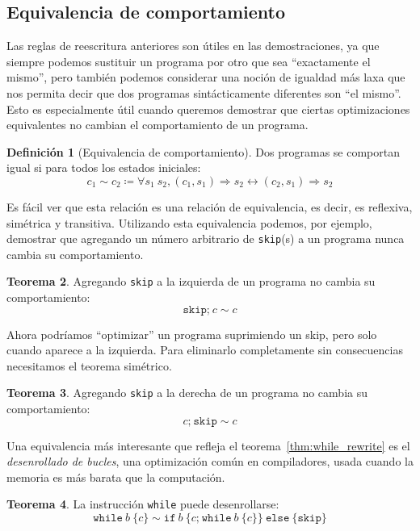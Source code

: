 \documentclass[
  a4paper, 
  10pt, 
  parskip=half, 
  toc=bibliography,
]{scrbook}
\theoremstyle{definition}
\theoremstyle{bolddef}
\newtheorem{theorem}{Teorema}[section]
\newtheorem{definition}[theorem]{Definición}
\renewcommand{\iff}{\leftrightarrow}
\newcommand{\ImpIfElse}[3]{\texttt{if} \ {#1} \ \{{#2}\} \ \texttt{else} \ \{{#3}\}}
\newcommand{\ImpWhile}[2]{\texttt{while} \ {#1} \ \{{#2}\}}
\newcommand{\ImpConcat}[2]{{#1} \texttt{;} \ {#2}}
\newcommand{\ImpSkip}{\texttt{skip}}
\newcommand{\bigstep}{\Longrightarrow}
\begin{document}
\subsection{Equivalencia de comportamiento}

Las reglas de reescritura anteriores son útiles en las demostraciones, ya que siempre
podemos sustituir un programa por otro que sea \enquote{exactamente el mismo}, pero
también podemos considerar una noción de igualdad más laxa que nos permita decir que
dos programas sintácticamente diferentes son \enquote{el mismo}. Esto es
especialmente útil cuando queremos demostrar que ciertas optimizaciones equivalentes no
cambian el comportamiento de un programa.

\begin{definition}[Equivalencia de comportamiento]
  Dos programas se comportan igual si para todos los estados iniciales:
  \[
  c_1 \sim c_2 \coloneqq \forall s_1 \ s_2, (c_1, s_1) \bigstep s_2 \iff (c_2, s_1) \bigstep s_2
  \]
\end{definition}

Es fácil ver que esta relación es una relación de equivalencia, es decir, es
reflexiva, simétrica y transitiva. Utilizando esta equivalencia podemos, por ejemplo, demostrar que
agregando un número arbitrario de \ImpSkip(s) a un programa nunca cambia su
comportamiento.
\begin{theorem}
  Agregando \ImpSkip{} a la izquierda de un programa no cambia su comportamiento:
  \[
  \ImpConcat{\ImpSkip}{c} \sim c
  \]
\end{theorem}

Ahora podríamos \enquote{optimizar} un programa suprimiendo un skip, pero solo cuando aparece
a la izquierda. Para eliminarlo completamente sin consecuencias necesitamos el
teorema simétrico.
\begin{theorem}
  Agregando \ImpSkip{} a la derecha de un programa no cambia su comportamiento:
  \[
  \ImpConcat{c}{\ImpSkip} \sim c
  \]
\end{theorem}

Una equivalencia más interesante que refleja el teorema~\ref{thm:while_rewrite} es
el \emph{desenrollado de bucles}, una optimización común en compiladores, usada
cuando la memoria es más barata que la computación.
\begin{theorem}
  La instrucción \texttt{while} puede desenrollarse:
  \[
  \ImpWhile{b}{c} \sim 
  \ImpIfElse{b}{\ImpConcat{c}{\ImpWhile{b}{c}}}{\ImpSkip}
  \]
\end{theorem}
\end{document}
